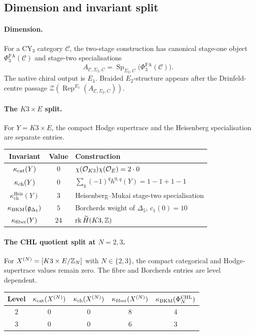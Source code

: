 \subsection*{Dimension and invariant split}

\paragraph{Dimension.}
For a CY\(_3\) category \(\mathcal C\), the two-stage construction has
canonical stage-one object \(\Phi^{\mathrm{FA}}_3(\mathcal C)\) and
stage-two specialisations
\[
  A_{\mathcal C,\Sigma_2,C}
  =\operatorname{Sp}_{\Sigma_2,C}\bigl(\Phi^{\mathrm{FA}}_3(\mathcal C)\bigr).
\]
The native chiral output is \(E_1\).  Braided \(E_2\)-structure appears
after the Drinfeld-centre passage
\(\mathcal Z(\operatorname{Rep}^{E_1}(A_{\mathcal C,\Sigma_2,C}))\).

\paragraph{The \(K3\times E\) split.}
For \(Y=K3\times E\), the compact Hodge supertrace and the Heisenberg
specialisation are separate entries.

\begin{center}
\small
\begin{tabular}{c|c|l}
\hline
Invariant & Value & Construction \\
\hline
\(\kappa_{\mathrm{cat}}(Y)\) & \(0\) &
\(\chi(\mathcal{O}_{K3})\chi(\mathcal{O}_E)=2\cdot0\) \\
\(\kappa_{\mathrm{ch}}(Y)\) & \(0\) &
\(\sum_q(-1)^qh^{0,q}(Y)=1-1+1-1\) \\
\(\kappa_{\mathrm{ch}}^{\mathrm{Heis}}(Y)\) & \(3\) &
Heisenberg--Mukai stage-two specialisation \\
\(\kappa_{\mathrm{BKM}}(\mathfrak g_{\Delta_5})\) & \(5\) &
Borcherds weight of \(\Delta_5\), \(c_1(0)=10\) \\
\(\kappa_{\mathrm{fiber}}(Y)\) & \(24\) &
\(\operatorname{rk}\widetilde H(K3,\mathbb{Z})\) \\
\hline
\end{tabular}
\end{center}

\paragraph{The CHL quotient split at \(N=2,3\).}
For \(X^{(N)}=[K3\times E/\mathbb{Z}_N]\) with \(N\in\{2,3\}\), the compact
categorical and Hodge-supertrace values remain zero.  The fibre and
Borcherds entries are level dependent.

\begin{center}
\small
\begin{tabular}{c|c|c|c|c}
\hline
Level & \(\kappa_{\mathrm{cat}}(X^{(N)})\) & \(\kappa_{\mathrm{ch}}(X^{(N)})\) &
\(\kappa_{\mathrm{fiber}}(X^{(N)})\) & \(\kappa_{\mathrm{BKM}}(\Phi^{\mathrm{CHL}}_N)\) \\
\hline
\(2\) & \(0\) & \(0\) & \(8\) & \(4\) \\
\(3\) & \(0\) & \(0\) & \(6\) & \(3\) \\
\hline
\end{tabular}
\end{center}
